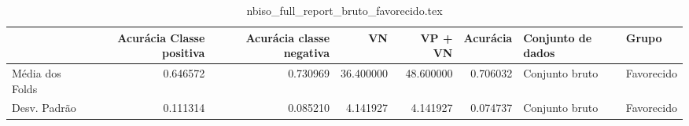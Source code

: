 \begin{table}
\centering
\caption{nbiso_full_report_bruto_favorecido.tex}
\label{nbiso_full_report_bruto_favorecido.tex}
\begin{tabular}{lrrrrrll}
\toprule
{} &  Acurácia Classe positiva &  Acurácia classe negativa &        VN  &   VP + VN  &  Acurácia & Conjunto de dados &       Grupo \\
\midrule
Média dos Folds &                  0.646572 &                  0.730969 &  36.400000 &  48.600000 &  0.706032 &    Conjunto bruto &  Favorecido \\
Desv. Padrão    &                  0.111314 &                  0.085210 &   4.141927 &   4.141927 &  0.074737 &    Conjunto bruto &  Favorecido \\
\bottomrule
\end{tabular}
\end{table}
